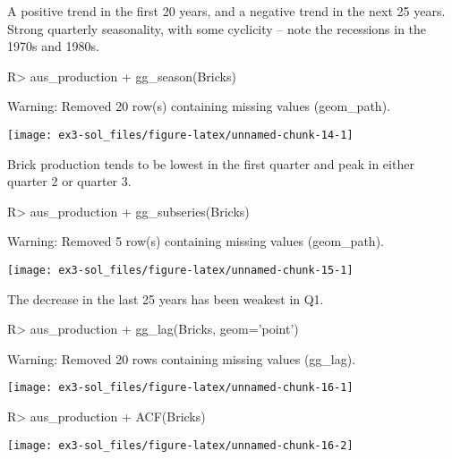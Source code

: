 \documentclass[
]{article}
\begin{document}
A positive trend in the first 20 years, and a negative trend in the next 25 years. Strong quarterly seasonality, with some cyclicity -- note the recessions in the 1970s and 1980s.

\begin{CodeChunk}
\begin{CodeInput}
R> aus_production %
+   gg_season(Bricks)
\end{CodeInput}
\begin{CodeOutput}
Warning: Removed 20 row(s) containing missing values (geom_path).
\end{CodeOutput}


\begin{center}\texttt{[image: ex3-sol\_files/figure-latex/unnamed-chunk-14-1]} \end{center}

\end{CodeChunk}

Brick production tends to be lowest in the first quarter and peak in either quarter 2 or quarter 3.

\begin{CodeChunk}
\begin{CodeInput}
R> aus_production %
+   gg_subseries(Bricks)
\end{CodeInput}
\begin{CodeOutput}
Warning: Removed 5 row(s) containing missing values (geom_path).
\end{CodeOutput}


\begin{center}\texttt{[image: ex3-sol\_files/figure-latex/unnamed-chunk-15-1]} \end{center}

\end{CodeChunk}

The decrease in the last 25 years has been weakest in Q1.

\begin{CodeChunk}
\begin{CodeInput}
R> aus_production %
+   gg_lag(Bricks, geom='point')
\end{CodeInput}
\begin{CodeOutput}
Warning: Removed 20 rows containing missing values (gg_lag).
\end{CodeOutput}


\begin{center}\texttt{[image: ex3-sol\_files/figure-latex/unnamed-chunk-16-1]} \end{center}

\begin{CodeInput}
R> aus_production %
+   ACF(Bricks) %
\end{CodeInput}


\begin{center}\texttt{[image: ex3-sol\_files/figure-latex/unnamed-chunk-16-2]} \end{center}

\end{CodeChunk}
\end{document}
